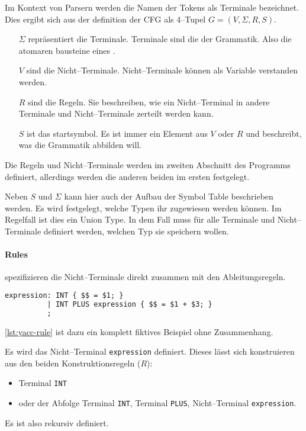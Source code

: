 Im Kontext von Parsern werden die Namen der Tokens als Terminale bezeichnet.
Dies ergibt sich aus der definition der \ac{CFG} als 4--Tupel $G=(V,\Sigma,R,S)$.~\autocite{sipser-1997}
\begin{itemize}
    \item[$\Sigma$] repräsentiert die Terminale.
    Terminale sind die  der Grammatik.
    Also die atomaren bausteine eines .
    \item[$V$] sind die Nicht--Terminale.
    Nicht--Terminale können als Variable verstanden werden.
    \item[$R$] sind die Regeln.
    Sie beschreiben, wie ein Nicht--Terminal in andere Terminale und Nicht--Terminale zerteilt werden kann.
    \item[$S$] ist das startsymbol.
    Es ist immer ein Element aus $V$ oder $R$ und beschreibt, was die Grammatik abbilden will.
\end{itemize}
Die Regeln und Nicht--Terminale werden im zweiten Abschnitt des Programms definiert, allerdings werden die anderen beiden im ersten festgelegt.

Neben $S$ und $\Sigma$ kann hier auch der Aufbau der Symbol Table beschrieben werden.
Es wird festgelegt, welche Typen ihr zugewiesen werden können.
Im Regelfall ist dies ein Union Type.
In dem Fall muss für alle Terminale und Nicht--Terminale definiert werden, welchen Typ sie speichern wollen.

\paragraph{Rules} spezifizieren die Nicht--Terminale direkt zusammen mit den Ableitungsregeln.
\begin{lstlisting}[label={lst:yacc-rule},caption={\acs{YACC} Regel},language=yacc]
expression: INT { $$ = $1; }
          | INT PLUS expression { $$ = $1 + $3; }
          ;
\end{lstlisting}
\autoref{lst:yacc-rule} ist dazu ein komplett fiktives Beispiel ohne Zusammenhang.

Es wird das Nicht--Terminal \verb|expression| definiert.
Dieses lässt sich konstruieren aus den beiden Konstruktionsregeln ($R$):
\begin{itemize}
    \item Terminal \verb|INT|
    \item oder der Abfolge Terminal \verb|INT|, Terminal \verb|PLUS|, Nicht--Terminal \verb|expression|.
\end{itemize}
Es ist also rekursiv definiert.

